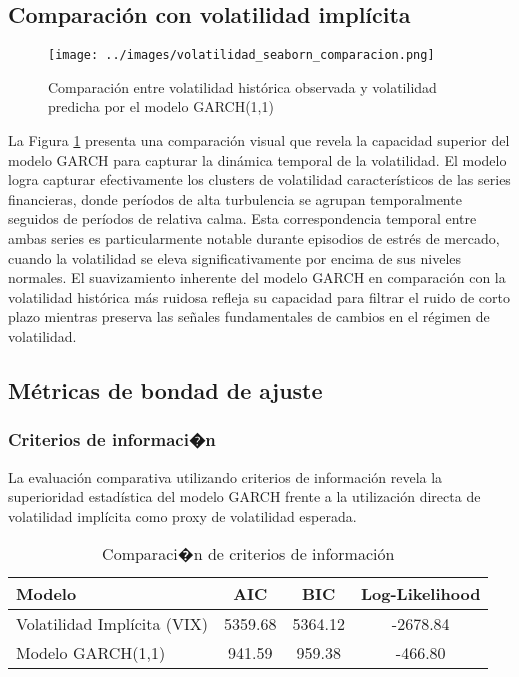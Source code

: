 \subsection{Comparación con volatilidad implícita}

\begin{figure}[hbt!]
    \centering
    \texttt{[image: ../images/volatilidad\_seaborn\_comparacion.png]}
    \caption{Comparación entre volatilidad histórica observada y volatilidad predicha por el modelo GARCH(1,1)}
    \label{fig:volatilidad_comparacion}   
\end{figure}

La Figura \ref{fig:volatilidad_comparacion} presenta una comparación visual que revela la capacidad superior del modelo GARCH para capturar la dinámica temporal de la volatilidad. El modelo logra capturar efectivamente los clusters de volatilidad característicos de las series financieras, donde períodos de alta turbulencia se agrupan temporalmente seguidos de períodos de relativa calma. Esta correspondencia temporal entre ambas series es particularmente notable durante episodios de estrés de mercado, cuando la volatilidad se eleva significativamente por encima de sus niveles normales. El suavizamiento inherente del modelo GARCH en comparación con la volatilidad histórica más ruidosa refleja su capacidad para filtrar el ruido de corto plazo mientras preserva las señales fundamentales de cambios en el régimen de volatilidad.

\subsection{Métricas de bondad de ajuste}

\subsubsection{Criterios de informaci�n}

La evaluación comparativa utilizando criterios de información revela la superioridad estadística del modelo GARCH frente a la utilización directa de volatilidad implícita como proxy de volatilidad esperada.

\begin{table}[hbt!]
\centering
\caption{Comparaci�n de criterios de información}
\begin{tabular}{lccc}
\hline
\textbf{Modelo} & \textbf{AIC} & \textbf{BIC} & \textbf{Log-Likelihood} \\
\hline
Volatilidad Implícita (VIX) & 5359.68 & 5364.12 & -2678.84 \\
Modelo GARCH(1,1) & 941.59 & 959.38 & -466.80 \\
\hline
\end{tabular}
\label{tab:criterios_info}
\end{table}

